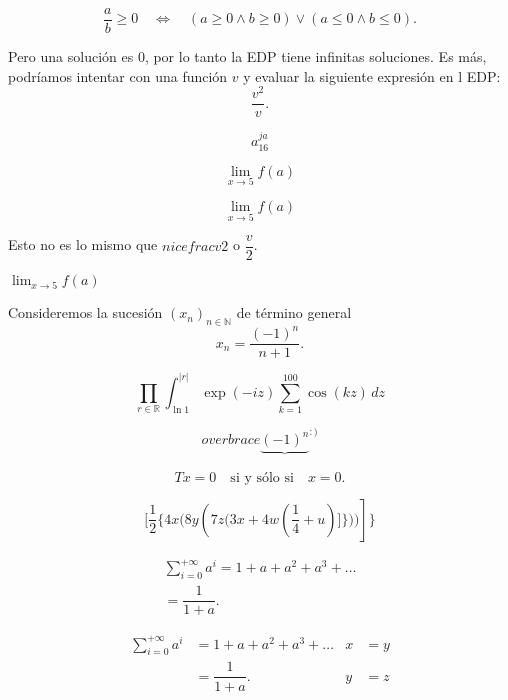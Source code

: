 \documentclass[a5paper, 12pt]{article}
\begin{document}
\begin{equation}
	\dfrac{a}{b} \geq 0 \quad \Leftrightarrow \quad (a\geq 0 \wedge b \geq 0) \lor (a\leq 0 \wedge b \leq 0).
\end{equation}

	
Pero una solución es \(0\), por lo tanto la EDP tiene infinitas soluciones. Es más, podríamos intentar con una función \(v\) y evaluar la siguiente expresión en l EDP:
\[
	\dfrac{v^2}{v} .	
\]	

\[
	a_{16}^{ja}
\]

\[
	\lim_{x \rightarrow 5} f(a)
\]

\[
	\lim_{x \to 5} f(a)
\]

Esto no es lo mismo que \(nicefrac{v}{2} \) o \( \dfrac{v}{2}\).

\vspace{2\baselineskip}

\(
	\displaystyle \lim_{x \to 5} f(a)
\)	

\vspace{2\baselineskip}	

Consideremos la sucesión \((x_{n})_{n \in \mathbb{N}} \) de término general
\[
	x_{n}= \dfrac{(-1)^n}{n+1}.
\]	
	
\vspace{2\baselineskip}	

\[
	\prod_{r \in \mathbb{R}} \int_{\ln{1}}^{|r|} \exp(-iz) \sum_{k=1}^{100} \cos(kz) \, dz
\]
	
\[
overbrace{\underbrace{(-1)^n}_{}}^{:)}
\]


\[
	Tx=0 \quad \text{si y sólo si} \quad x=0.
\]
	
\[
	\Bigg [ \dfrac{1}{2} \bigg \{ 4x \Big ( 8y \left( 7z \big ( 3x+4w( \dfrac{1}{4} + u) \Bigg ] \bigg \} \Big ) ) \right] \}
\]	
	


\begin{align}
\sum_{i=0}^{+ \infty} a^i  = 1 + a + a^2 + a^3 + \ldots	
\\
	 = \dfrac{1}{1+a}.
\end{align}

\begin{align}
\sum_{i=0}^{+ \infty} a^i & = 1 + a + a^2 + a^3 + \ldots & x & =y
\\
	& = \dfrac{1}{1+a}.							 & y & =z
\end{align}
\end{document}
